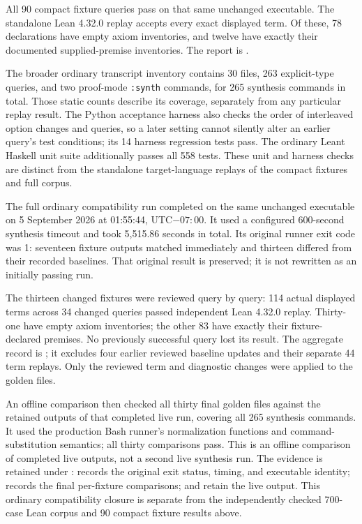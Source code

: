 \documentclass[11pt]{article}
\newcommand{\code}[1]{\texttt{#1}}
\begin{document}
All 90 compact fixture queries pass on that same unchanged executable.
The standalone Lean 4.32.0 replay accepts every exact displayed term. Of these,
78 declarations have empty axiom inventories, and twelve have exactly their
documented supplied-premise inventories. The report is
.

The broader ordinary transcript inventory contains 30 files, 263 explicit-type
queries, and two proof-mode \code{:synth} commands, for 265 synthesis commands
in total. Those static counts describe its coverage, separately from any
particular replay result. The Python acceptance harness also checks the order
of interleaved option changes and queries, so a later setting cannot silently
alter an earlier query's test conditions; its 14 harness regression tests pass.
The ordinary Leant Haskell unit suite additionally passes all 558 tests. These
unit and harness checks are distinct from the standalone target-language
replays of the compact fixtures and full corpus.

The full ordinary compatibility run completed on the same unchanged executable
on 5 September 2026 at 01:55:44, UTC$-07{:}00$. It used a configured
600-second synthesis timeout and took 5,515.86 seconds in total. Its original
runner exit code was 1: seventeen fixture outputs matched immediately and
thirteen differed from their recorded baselines. That original result is
preserved; it is not rewritten as an initially passing run.

The thirteen changed fixtures were reviewed query by query: 114 actual
displayed terms across 34 changed queries passed independent Lean 4.32.0
replay. Thirty-one have empty axiom inventories; the other 83 have exactly
their fixture-declared premises. No previously successful query lost its
result. The aggregate record is
; it excludes
four earlier reviewed baseline updates and their separate 44 term replays.
Only the reviewed term and diagnostic changes were applied to the golden files.

An offline comparison then checked all thirty final golden files against the
retained outputs of that completed live run, covering all 265 synthesis
commands. It used the production Bash runner's normalization functions and
command-substitution semantics; all thirty comparisons pass. This is an
offline comparison of completed live outputs, not a second live synthesis
run. The evidence is retained under
: 
records the original exit status, timing, and executable identity;
 records the final per-fixture comparisons;
 and  retain the live output. This ordinary
compatibility closure is separate from the independently checked 700-case
Lean corpus and 90 compact fixture results above.
\end{document}
